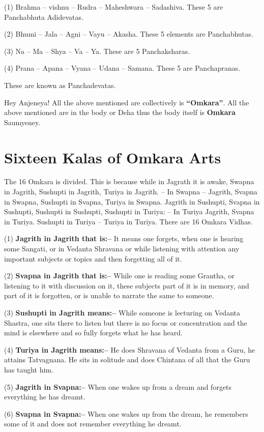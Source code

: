 (1) Brahma – vishnu – Rudra – Maheshwara – Sadashiva. These 5 are Panchabhuta Adidevatas.

(2) Bhumi – Jala – Agni – Vayu – Akasha. These 5 elements are Panchabhutas.

(3) Na – Ma – Shya – Va – Ya. These are 5 Panchaksharas.

(4) Prana – Apana – Vyana – Udana – Samana. These 5 are Panchapranas.

These are known as Panchadevatas.

Hey Anjeneya! All the above mentioned are collectively is \textbf{“Omkara”}. All the above mentioned are in the body or Deha thus the body itself is \textbf{Omkara} Saumyeney.

\chapter{Sixteen Kalas of Omkara Arts}

The 16 Omkara is divided. This is because while in Jagrath it is awake, Swapna in Jagrith, Sushupti in Jagrith, Turiya in Jagrith. – In Swapna – Jagrith, Svapna in Swapna, Sushupti in Svapna, Turiya in Swapna. Jagrith in Sushupti, Svapna in Sushupti, Sushupti in Sushupti, Sushupti in Turiya: – In Turiya Jagrith, Svapna in Turiya. Sushupti in Turiya – Turiya in Turiya. There are 16 Omkara Vidhas.

(1) \textbf{Jagrith in Jagrith that is:–} It means one forgets, when one is hearing some Sangati, or in Vedanta Shravana or while listening with attention any important subjects or topics and then forgetting all of it.

(2) \textbf{Svapna in Jagrith that is:–} While one is reading some Grantha, or listening to it with discussion on it, these subjects part of it is in memory, and part of it is forgotten, or is unable to narrate the same to someone.

(3) \textbf{Sushupti in Jagrith means:–} While someone is lecturing on Vedanta Shastra, one sits there to listen but there is no focus or concentration and the mind is elsewhere and so fully forgets what he has heard.

(4) \textbf{Turiya in Jagrith means:–} He does Shravana of Vedanta from a Guru, he attains Tatvagnana. He sits in solitude and does Chintana of all that the Guru has taught him.

(5) \textbf{Jagrith in Svapna:–} When one wakes up from a dream and forgets everything he has dreamt.

(6) \textbf{Svapna in Svapna:–} When one wakes up from the dream, he remembers some of it and does not remember everything he dreamt.

